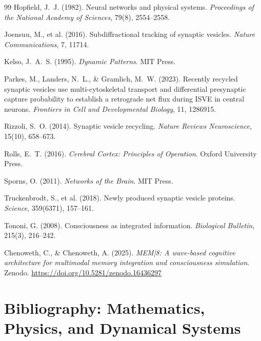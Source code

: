 \documentclass[12pt, oneside]{book}
\theoremstyle{plain}
\theoremstyle{definition}
\theoremstyle{remark}
\begin{document}
\begin{thebibliography}{99}
Hopfield, J.~J. (1982).
Neural networks and physical systems.
\textit{Proceedings of the National Academy of Sciences}, 79(8), 2554--2558.

Joensuu, M., et al. (2016).
Subdiffractional tracking of synaptic vesicles.
\textit{Nature Communications}, 7, 11714.

Kelso, J.~A.~S. (1995).
\textit{Dynamic Patterns}.
MIT Press.

Parkes, M., Landers, N.~L., \& Gramlich, M.~W. (2023).
Recently recycled synaptic vesicles use multi-cytoskeletal transport
and differential presynaptic capture probability to establish a
retrograde net flux during ISVE in central neurons.
\textit{Frontiers in Cell and Developmental Biology}, 11, 1286915.

Rizzoli, S.~O. (2014).
Synaptic vesicle recycling.
\textit{Nature Reviews Neuroscience}, 15(10), 658--673.

Rolls, E.~T. (2016).
\textit{Cerebral Cortex: Principles of Operation}.
Oxford University Press.

Sporns, O. (2011).
\textit{Networks of the Brain}.
MIT Press.

Truckenbrodt, S., et al. (2018).
Newly produced synaptic vesicle proteins.
\textit{Science}, 359(6371), 157--161.

Tononi, G. (2008).
Consciousness as integrated information.
\textit{Biological Bulletin}, 215(3), 216--242.

Chenoweth, C., \& Chenoweth, A. (2025).
\textit{MEM|8: A wave-based cognitive architecture for multimodal
memory integration and consciousness simulation}.
Zenodo.
\url{https://doi.org/10.5281/zenodo.16436297}

\end{thebibliography}

\chapter*{Bibliography: Mathematics, Physics, and Dynamical Systems}
\end{document}
